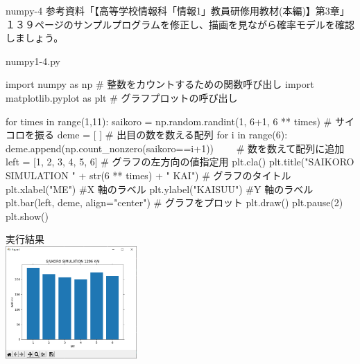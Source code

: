 \begin{pabox}{numpy-4}
参考資料「【高等学校情報科「情報1」教員研修用教材(本編)】第3章」１３９ページのサンプルプログラムを修正し、描画を見ながら確率モデルを確認しましょう。

\begin{legbox}{numpy1-4.py}
\begin{listing}{1}
import numpy as np # 整数をカウントするための関数呼び出し
import matplotlib.pyplot as plt # グラフプロットの呼び出し

for times in range(1,11):
    saikoro = np.random.randint(1, 6+1, 6 ** times) # サイコロを振る
    deme = [ ] # 出目の数を数える配列
    for i in range(6):
        deme.append(np.count_nonzero(saikoro==i+1)) 
　　# 数を数えて配列に追加
    left = [1, 2, 3, 4, 5, 6] # グラフの左方向の値指定用
    plt.cla()
    plt.title("SAIKORO SIMULATION " + str(6 ** times) + " KAI") 
                    # グラフのタイトル
    plt.xlabel("ME") #X 軸のラベル
    plt.ylabel("KAISUU") #Y 軸のラベル
    plt.bar(left, deme, align="center") # グラフをプロット
    plt.draw() 
    plt.pause(2)
plt.show()
\end{listing}

実行結果\\

\includegraphics[width=5cm]{images/graph5.png} 

\end{legbox}


\end{pabox}

